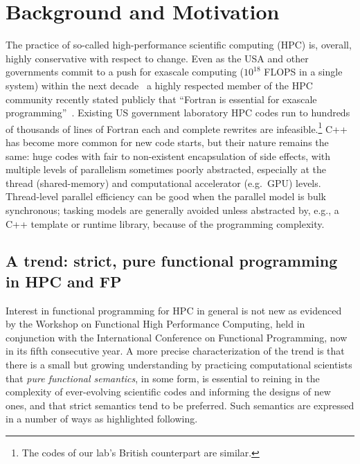 \documentclass{llncs}
\begin{document}
\section{Background and Motivation}
The practice of so-called high-performance scientific computing (HPC) is,
overall, highly conservative with respect to change.  Even as the USA and
other governments commit to a push for exascale computing ($10^{18}$ FLOPS in
a single system) within the next
decade~\cite{Exascale-roadmap,EUexascale,Exascale-org} a highly respected
member of the HPC community recently stated publicly that ``Fortran is
essential for exascale programming''~\cite{Heroux16}.  Existing US government
laboratory HPC codes run to hundreds of thousands of lines of Fortran each and
complete rewrites are infeasible.\footnote{The codes of our lab's British
  counterpart are similar.}  C++ has become more common for new code starts,
but their nature remains the same: huge codes with fair to non-existent
encapsulation of side effects, with multiple levels of parallelism sometimes
poorly abstracted, especially at the thread (shared-memory) and computational
accelerator (e.g.\ GPU) levels.  Thread-level parallel efficiency can be good
when the parallel model is bulk synchronous; tasking models are generally
avoided unless abstracted by, e.g., a C++ template or runtime library, because
of the programming complexity.

\subsection{A trend: strict, pure functional programming in HPC and FP}
Interest in functional programming for HPC in general is not new as evidenced
by the Workshop on Functional High Performance Computing, held in conjunction
with the International Conference on Functional Programming, now in its fifth
consecutive year.  A more precise characterization of the trend is that there
is a small but growing understanding by practicing computational scientists
that \emph{pure functional semantics}, in some form, is essential to reining
in the complexity of ever-evolving scientific codes and informing the designs
of new ones, and that strict semantics tend to be preferred.  Such semantics
are expressed in a number of ways as highlighted following.
\end{document}
